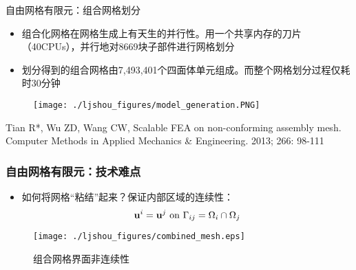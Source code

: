 \documentclass[mathserif]{beamer}
\begin{document}
\begin{CJK}{UTF8}{gkai}
	\begin{frame}{自由网格有限元：组合网格划分}
    		\begin{itemize}
    			\item 组合化网格在网格生成上有天生的并行性。用一个共享内存的刀片（40CPUs），并行地对8669块子部件进行网格划分
    		    \item 划分得到的组合网格由7,493,401个四面体单元组成。而整个网格划分过程仅耗时30分钟
    		\end{itemize}
    		\begin{figure}
    		\centering
    		\texttt{[image: ./ljshou\_figures/model\_generation.PNG]}
    		\end{figure}
    		\tiny Tian R*, Wu ZD, Wang CW, Scalable FEA on non-conforming assembly mesh. Computer Methods in Applied Mechanics \& Engineering. 2013; 266: 98-111
	\end{frame}

	\begin{frame}
		\frametitle{自由网格有限元：技术难点}
				\begin{itemize}
					\item 如何将网格“粘结”起来？保证内部区域的连续性：
					\begin{equation*}
						{\bf u}^i = {\bf u}^j \text{ on } \Gamma_{ij} = \Omega_i \cap \Omega_j
					\end{equation*}
				\end{itemize}
				\begin{figure}
					\centering
					\texttt{[image: ./ljshou\_figures/combined\_mesh.eps]}
					\caption{组合网格界面非连续性}
				\end{figure}
	\end{frame}
			


\end{CJK}
\end{document}
